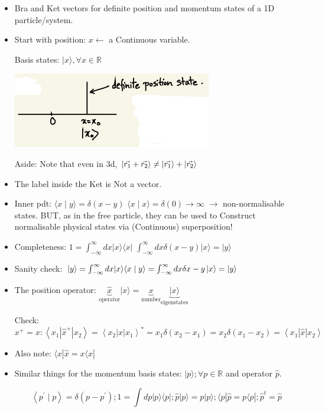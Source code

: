 \documentclass{article}
\begin{document}
\begin{itemize}
    \item Bra and Ket vectors for definite position and momentum states of a 1D particle/system.
    \item Start with position: $x \leftarrow$ a Continuous variable.
    
    Basis states: $|x\rangle, \forall x \in \mathbb{R}$
    
    \includegraphics[width = 0.4 \textwidth]{Lecture12/4.png}
    
    Aside: Note that even in 3d, $\ket{\vec{r_1}  + \vec{r_2}} \neq \ket{\vec{r_1}} + \ket{\vec{r_2}}$
    
    \item The label inside the Ket is Not a vector.
    
    \hfill
    
\item  Inner pdt: $\langle x \mid y\rangle=\delta(x-y)$
$\langle x \mid x\rangle=\delta(0) \rightarrow \infty$
$\longrightarrow$ non-normalisable states. BUT, as in the free particle, they can be used to Construct normalisable physical states via (Continuous) superposition!
\item Completeness: $1=\int_{-\infty}^{\infty} d x|x\rangle\langle x|$
 $\int_{-\infty}^{\infty} d x \delta(x-y)|x\rangle=|y\rangle$
 
 \item Sanity check: $|y\rangle=\int_{-\infty}^{\infty} d x|x\rangle\langle x \mid y\rangle=\int_{-\infty}^{\infty} d x \delta{x-y} \ket{x} = \ket{y}$
 
 \item The position operator: $\underbrace{\hat{x}}_{\text{operator}}|x\rangle= \underbrace{x}_{\text{number}} \underbrace{|x\rangle}_{\text{eigenstates}}$
 
 
Check: $x^{+}=x:\left\langle x_{1}\left|\hat{x}^{+}\right| x_{2}\right\rangle=\left\langle x_{2}|x| x_{1}\right\rangle^{*}=x_{1} \delta\left(x_{2}-x_{1}\right)=x_{2} \delta\left(x_{1}-x_{2}\right)=\left\langle x_{1}|\hat{x}| x_{2}\right\rangle$

\item Also note: $\langle x| \hat{x}=x\langle x|$


\item Similar things for the momentum basis states: $|p\rangle ; \forall p \in \mathbb{R}$ and operator $\hat{p}$.

$$\left\langle p^{\prime} \mid p\right\rangle=\delta\left(p-p^{\prime}\right) ; 1=\int d p|p\rangle\langle p|; \hat{p}| p\rangle=p|p\rangle ;\langle p| \hat{p}=p\langle p| ; \hat{p}^{t}=\hat{p}$$

\end{itemize}
\end{document}
